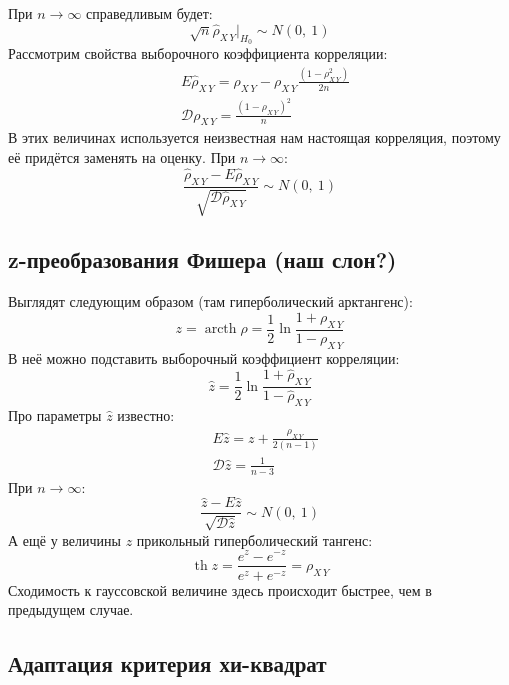 \documentclass[12pt, a4paper]{article}
\newcommand{\dev}{\mathcal{D}}
\begin{document}
При $n \to \infty$ справедливым будет:
\[
\sqrt{n} \hat \rho_{X\, Y} \Big|_{H_0} \sim N(0,\ 1)
\]
Рассмотрим свойства выборочного коэффициента корреляции:
\begin{equation*}
    \begin{aligned}
        & E\hat \rho_{X\, Y} = \rho_{X\, Y} - \rho_{X\, Y} \frac{ (1 - \rho_{X\, Y}^2) }{2n}\\
        & \dev \rho_{X\, Y} = \frac{ {\left( 1 - \rho_{X\, Y} \right)}^2 }{n}
    \end{aligned}
\end{equation*}
В этих величинах используется неизвестная нам настоящая корреляция, поэтому её придётся заменять на оценку. При $n \to \infty$:
\[
\frac{\hat \rho_{X\, Y} - E\hat \rho_{X\, Y}}{\sqrt{\dev \hat\rho_{X\, Y}}} \sim N(0,\ 1)
\]
\subsection*{z-преобразования Фишера (наш слон?)}
Выглядят следующим образом (там гиперболический арктангенс):
\[
z = \operatorname{arcth} \rho = \frac{1}{2} \ln \frac{1 + \rho_{X\, Y}}{1 - \rho_{X\, Y}}
\]
В неё можно подставить выборочный коэффициент корреляции:
\[
\hat z = \frac{1}{2} \ln \frac{1 + \hat \rho_{X\, Y}}{1 - \hat \rho_{X\, Y}}
\]
Про параметры $\hat z$ известно:
\begin{equation*}
    \begin{aligned}
        & E \hat z = z + \frac{\rho_{X\, Y}}{2 (n - 1)}\\
        & \dev \hat z = \frac{1}{n - 3}
    \end{aligned}
\end{equation*}
При $n \to \infty$:
\[
\frac{\hat z - E\hat z}{\sqrt{\dev \hat z}} \sim N(0,\ 1)
\]
А ещё у величины $z$ прикольный гиперболический тангенс:
\[
\operatorname{th} z = \frac{e^z - e^{-z}}{e^z + e^{-z}} = \rho_{X\, Y}
\]
Сходимость к гауссовской величине здесь происходит быстрее, чем в предыдущем случае.
\subsection*{Адаптация критерия хи-квадрат}
\end{document}
